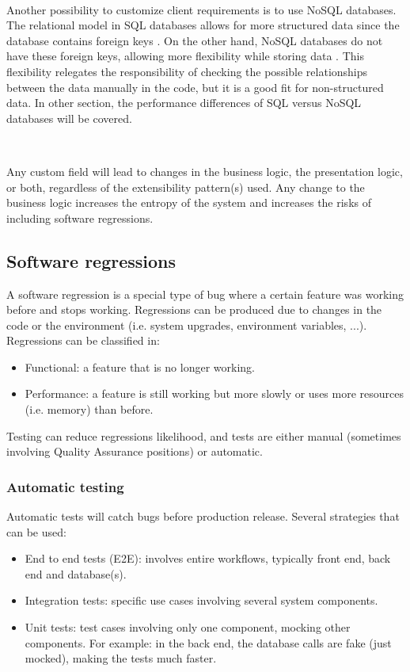 \documentclass[12pt,english]{article} %
\begin{document}
\

Another possibility to customize client requirements is to use NoSQL databases.
The relational model in SQL databases allows for more structured data since the database contains foreign keys \cite{comparison-query-performance-relational-and-non-relational-databases}.
On the other hand, NoSQL databases do not have these foreign keys, allowing more flexibility while storing data \cite{comparison-query-performance-relational-and-non-relational-databases}.
This flexibility relegates the responsibility of checking the possible relationships between the data manually in the code, but it is a good fit for non-structured data.
In other section, the performance differences of SQL versus NoSQL databases will be covered.

\   

Any custom field will lead to changes in the business logic, the presentation logic, or both, regardless of the extensibility pattern(s) used.
Any change to the business logic increases the entropy of the system and increases the risks of including software regressions.



\subsection{Software regressions}
A software regression is a special type of bug where a certain feature was working before and stops working.
Regressions can be produced due to changes in the code or the environment (i.e. system upgrades, environment variables, ...).
Regressions can be classified in:
\begin{itemize}
    \item Functional: a feature that is no longer working.
    \item Performance: a feature is still working but more slowly or uses more resources (i.e. memory) than before.
\end{itemize}

Testing can reduce regressions likelihood, and tests are either manual (sometimes involving Quality Assurance positions) or automatic.

\subsubsection{Automatic testing}
Automatic tests will catch bugs before production release.
Several strategies that can be used:
\begin{itemize}
	\item End to end tests (E2E): involves entire workflows, typically front end, back end and database(s).
	\item Integration tests: specific use cases involving several system components.
	\item Unit tests: test cases involving only one component, mocking other components.
	For example: in the back end, the database calls are fake (just mocked), making the tests much faster.
\end{itemize}
\end{document}
